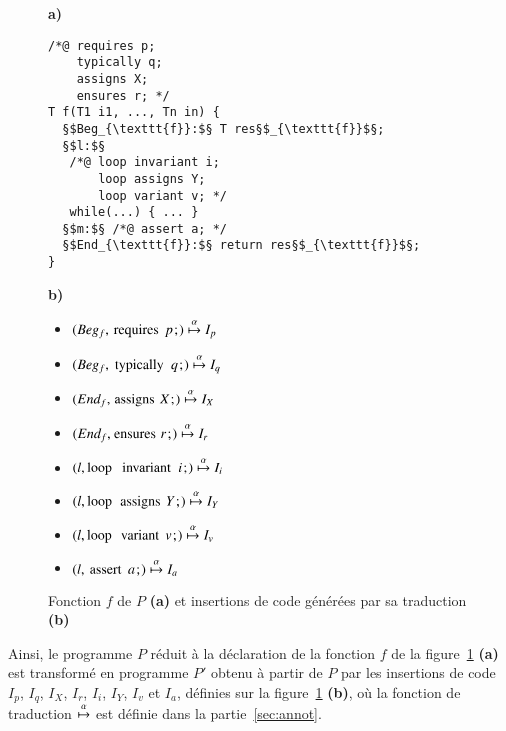\begin{figure}\centering
  \begin{minipage}{.4\columnwidth}\textbf{a)}
    \begin{lstlisting}[escapechar=§]
/*@ requires p;
    typically q;
    assigns X;
    ensures r; */
T f(T1 i1, ..., Tn in) {
  §$Beg_{\texttt{f}}:$§ T res§$_{\texttt{f}}$§;
  §$l:$§
   /*@ loop invariant i;
       loop assigns Y;
       loop variant v; */
   while(...) { ... }
  §$m:$§ /*@ assert a; */
  §$End_{\texttt{f}}:$§ return res§$_{\texttt{f}}$§;
}
    \end{lstlisting}
  \end{minipage}
  \begin{minipage}{.4\columnwidth}\textbf{b)}
    \begin{itemize}
    \item $(Beg_f, \mbox{\lstinline'requires'}~p\semicolon) \arule I_p$
    \item $(Beg_f, \mbox{\lstinline'typically'}~q\semicolon) \arule I_q$
    \item $(End_f, \mbox{\lstinline'assigns'}~X\semicolon) \arule I_X$
    \item $(End_f, \mbox{\lstinline'ensures'}~r\semicolon) \arule I_r$
    \item $(l, \mbox{\lstinline'loop invariant'}~i\semicolon) \arule I_i$
    \item $(l, \mbox{\lstinline'loop assigns'}~Y\semicolon) \arule I_Y$
    \item $(l, \mbox{\lstinline'loop variant'}~v\semicolon) \arule I_v$
    \item $(l, \mbox{\lstinline'assert'}~a\semicolon) \arule I_a$
    \end{itemize}
  \end{minipage}
  \caption{Fonction $f$ de $P$ \textbf{(a)} et insertions de code générées par
    sa traduction \textbf{(b)}\label{fig:P}}
\end{figure}

Ainsi, le programme $P$ réduit à la déclaration de la fonction $f$ de la
figure~\ref{fig:P} \textbf{(a)} est transformé en programme $P'$ obtenu à partir
de $P$ par les insertions de code $I_p$, $I_q$, $I_X$, $I_r$, $I_i$, $I_Y$,
$I_v$ et $I_a$, définies sur la figure~\ref{fig:P} \textbf{(b)}, où la fonction
de traduction $\overset{\alpha}{\mapsto}$ est définie dans la partie~\ref{sec:annot}.

